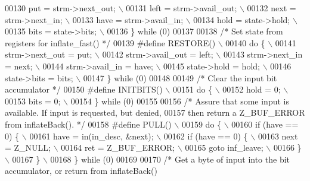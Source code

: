 \begin{DoxyCode}
00130 \textcolor{preprocessor}{        put = strm->next\_out; \(\backslash\)}
00131 \textcolor{preprocessor}{        left = strm->avail\_out; \(\backslash\)}
00132 \textcolor{preprocessor}{        next = strm->next\_in; \(\backslash\)}
00133 \textcolor{preprocessor}{        have = strm->avail\_in; \(\backslash\)}
00134 \textcolor{preprocessor}{        hold = state->hold; \(\backslash\)}
00135 \textcolor{preprocessor}{        bits = state->bits; \(\backslash\)}
00136 \textcolor{preprocessor}{    \} while (0)}
00137 
00138 \textcolor{comment}{/* Set state from registers for inflate\_fast() */}
00139 \textcolor{preprocessor}{#define RESTORE() \(\backslash\)}
00140 \textcolor{preprocessor}{    do \{ \(\backslash\)}
00141 \textcolor{preprocessor}{        strm->next\_out = put; \(\backslash\)}
00142 \textcolor{preprocessor}{        strm->avail\_out = left; \(\backslash\)}
00143 \textcolor{preprocessor}{        strm->next\_in = next; \(\backslash\)}
00144 \textcolor{preprocessor}{        strm->avail\_in = have; \(\backslash\)}
00145 \textcolor{preprocessor}{        state->hold = hold; \(\backslash\)}
00146 \textcolor{preprocessor}{        state->bits = bits; \(\backslash\)}
00147 \textcolor{preprocessor}{    \} while (0)}
00148 
00149 \textcolor{comment}{/* Clear the input bit accumulator */}
00150 \textcolor{preprocessor}{#define INITBITS() \(\backslash\)}
00151 \textcolor{preprocessor}{    do \{ \(\backslash\)}
00152 \textcolor{preprocessor}{        hold = 0; \(\backslash\)}
00153 \textcolor{preprocessor}{        bits = 0; \(\backslash\)}
00154 \textcolor{preprocessor}{    \} while (0)}
00155 
00156 \textcolor{comment}{/* Assure that some input is available.  If input is requested, but denied,}
00157 \textcolor{comment}{   then return a Z\_BUF\_ERROR from inflateBack(). */}
00158 \textcolor{preprocessor}{#define PULL() \(\backslash\)}
00159 \textcolor{preprocessor}{    do \{ \(\backslash\)}
00160 \textcolor{preprocessor}{        if (have == 0) \{ \(\backslash\)}
00161 \textcolor{preprocessor}{            have = in(in\_desc, &next); \(\backslash\)}
00162 \textcolor{preprocessor}{            if (have == 0) \{ \(\backslash\)}
00163 \textcolor{preprocessor}{                next = Z\_NULL; \(\backslash\)}
00164 \textcolor{preprocessor}{                ret = Z\_BUF\_ERROR; \(\backslash\)}
00165 \textcolor{preprocessor}{                goto inf\_leave; \(\backslash\)}
00166 \textcolor{preprocessor}{            \} \(\backslash\)}
00167 \textcolor{preprocessor}{        \} \(\backslash\)}
00168 \textcolor{preprocessor}{    \} while (0)}
00169 
00170 \textcolor{comment}{/* Get a byte of input into the bit accumulator, or return from inflateBack()}

\end{DoxyCode}
